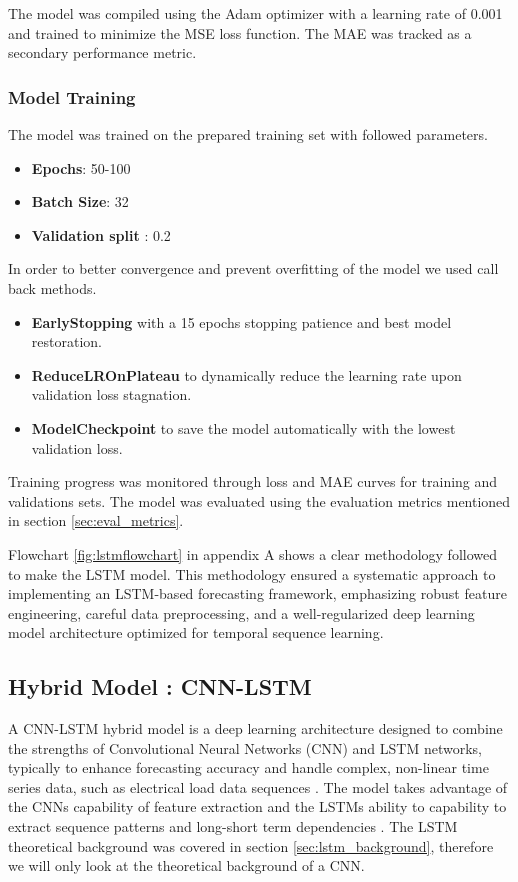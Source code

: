  The model was compiled using the Adam optimizer with a learning rate of 0.001 and trained to minimize the MSE loss function. The MAE was tracked as a secondary performance metric.
 
 \subsubsection{Model Training}The model was trained on the prepared training set with followed parameters.
 {\small
 \begin{itemize}
 	\item \textbf{Epochs}:  50-100
 	\item \textbf{Batch Size}:  32
 	\item\textbf{Validation split} : 0.2
 	\end{itemize}
 }
 	In order to better convergence and prevent overfitting of the model we used call back methods. 
 {\small
 		\begin{itemize}
 		\item \textbf{EarlyStopping} with a  15 epochs stopping patience and best model restoration.
 		\item \textbf{ReduceLROnPlateau} to dynamically reduce the learning rate upon validation loss stagnation.
 		\item \textbf{ModelCheckpoint} to save the model automatically with the lowest validation loss.
 	\end{itemize} }
 Training progress was monitored through loss and MAE curves for training and validations sets. The model was evaluated using the evaluation metrics mentioned in section \ref{sec:eval_metrics}.
 	
Flowchart \ref{fig:lstmflowchart} in appendix A shows a clear methodology followed to make the LSTM model. This methodology ensured a systematic approach to implementing an LSTM-based forecasting framework, emphasizing robust feature engineering, careful data preprocessing, and a well-regularized deep learning model architecture optimized for temporal sequence learning.


\subsection{Hybrid Model : CNN-LSTM }
A CNN-LSTM hybrid model is a deep learning architecture designed to combine the strengths of Convolutional Neural Networks (CNN) and LSTM networks, typically to enhance forecasting accuracy and handle complex, non-linear time series data, such as electrical load data sequences \cite{zhu2025novel}. The model takes advantage of the CNNs capability of feature extraction and the LSTMs ability to capability to extract sequence patterns and long-short term dependencies \cite{alhussein2020hybrid}. The LSTM theoretical background was covered in section \ref{sec:lstm_background}, therefore we will only look at the theoretical background of a CNN.


